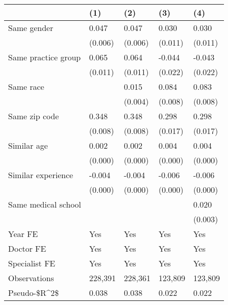 \begin{tabular}{lllll}
\hline
& (1) & (2) & (3) & (4) \\ \hline
Same gender                        & 0.047   & 0.047   & 0.030   & 0.030   \\
& (0.006) & (0.006) & (0.011) & (0.011) \\
Same practice group                & 0.065   & 0.064   & -0.044  & -0.043  \\
& (0.011) & (0.011) & (0.022) & (0.022) \\
Same race                          &         & 0.015   & 0.084   & 0.083   \\
&         & (0.004) & (0.008) & (0.008) \\
Same zip code                      & 0.348   & 0.348   & 0.298   & 0.298   \\
& (0.008) & (0.008) & (0.017) & (0.017) \\
Similar age                        & 0.002   & 0.002   & 0.004   & 0.004   \\
& (0.000) & (0.000) & (0.000) & (0.000) \\
Similar experience                 & -0.004  & -0.004  & -0.006  & -0.006  \\
& (0.000) & (0.000) & (0.000) & (0.000) \\
Same medical school                &         &         &         & 0.020   \\
&         &         &         & (0.003) \\
Year FE                            & Yes     & Yes     & Yes     & Yes     \\
Doctor FE                          & Yes     & Yes     & Yes     & Yes     \\
Specialist FE                      & Yes     & Yes     & Yes     & Yes     \\
Observations                       & 228,391 & 228,361 & 123,809 & 123,809 \\
Pseudo-\$R\textasciicircum{}2\$ & 0.038   & 0.038   & 0.022   & 0.022   \\
\hline
\end{tabular}
